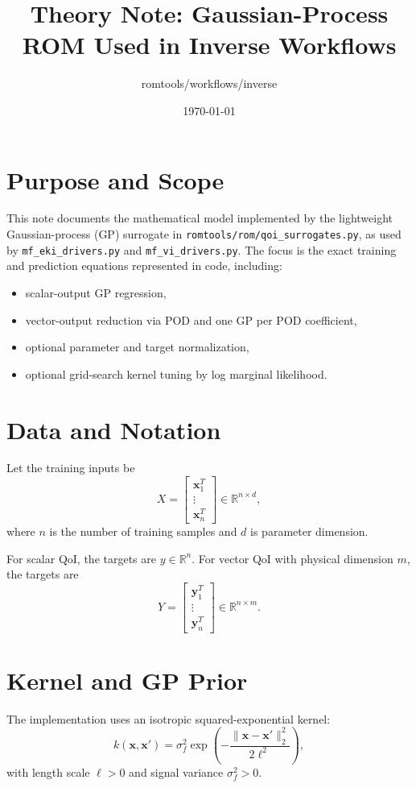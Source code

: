\documentclass[11pt]{article}
\title{Theory Note: Gaussian-Process ROM Used in Inverse Workflows}
\author{romtools/workflows/inverse}
\date{\today}
\begin{document}
\maketitle

\section{Purpose and Scope}
This note documents the mathematical model implemented by the lightweight Gaussian-process (GP)
surrogate in \texttt{romtools/rom/qoi\_surrogates.py}, as used by
\texttt{mf\_eki\_drivers.py} and \texttt{mf\_vi\_drivers.py}.
The focus is the exact training and prediction equations represented in code, including:
\begin{itemize}[leftmargin=1.5em]
\item scalar-output GP regression,
\item vector-output reduction via POD and one GP per POD coefficient,
\item optional parameter and target normalization,
\item optional grid-search kernel tuning by log marginal likelihood.
\end{itemize}

\section{Data and Notation}
Let the training inputs be
\[
X = \begin{bmatrix}
\bm{x}_1^T\\
\vdots\\
\bm{x}_n^T
\end{bmatrix} \in \mathbb{R}^{n\times d},
\]
where $n$ is the number of training samples and $d$ is parameter dimension.

For scalar QoI, the targets are $y\in\mathbb{R}^n$.
For vector QoI with physical dimension $m$, the targets are
\[
Y=\begin{bmatrix}
\bm{y}_1^T\\
\vdots\\
\bm{y}_n^T
\end{bmatrix}\in\mathbb{R}^{n\times m}.
\]

\section{Kernel and GP Prior}
The implementation uses an isotropic squared-exponential kernel:
\[
k(\bm{x},\bm{x}') = \sigma_f^2
\exp\!\left(-\frac{\|\bm{x}-\bm{x}'\|_2^2}{2\ell^2}\right),
\]
with length scale $\ell>0$ and signal variance $\sigma_f^2>0$.
\end{document}
